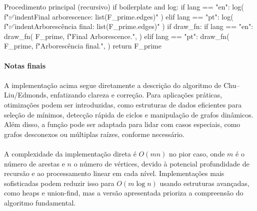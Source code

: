 \documentclass[12pt,a4paper]{article}
\begin{document}
\begin{pybox}{Procedimento principal (recursivo)}
        if boilerplate and log:
            if lang == "en":
                log(
                    f"\n✅{indent}Final arborescence: {list(F_prime.edges)}"
                )
            elif lang == "pt":
                log(
                    f"\n✅{indent}Arborescência final: {list(F_prime.edges)}"
                )
            if draw_fn:
                if lang == "en":
                    draw_fn(
                        F_prime,
                        f"Final Arborescence.",
                    )
                elif lang == "pt":
                    draw_fn(
                        F_prime,
                        f"Arborescência final.",
                    )
        return F_prime
\end{pybox}

\paragraph{Notas finais}
\paragraph{}
A implementação acima segue diretamente a descrição do algoritmo de Chu–Liu/Edmonds, enfatizando clareza e correção. Para aplicações práticas, otimizações podem ser introduzidas, como estruturas de dados eficientes para seleção de mínimos, detecção rápida de ciclos e manipulação de grafos dinâmicos. Além disso, a função pode ser adaptada para lidar com casos especiais, como grafos desconexos ou múltiplas raízes, conforme necessário.

\paragraph{}
A complexidade da implementação direta é \(O(mn)\) no pior caso, onde \(m\) é o número de arestas e \(n\) o número de vértices, devido à potencial profundidade de recursão e ao processamento linear em cada nível. Implementações mais sofisticadas podem reduzir isso para \(O(m \log n)\) usando estruturas avançadas, como heaps e union-find, mas a versão apresentada prioriza a compreensão do algoritmo fundamental.
\end{document}
